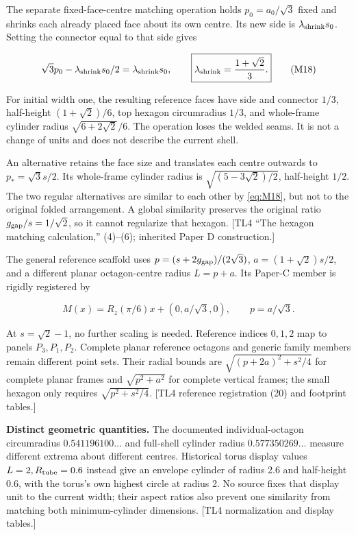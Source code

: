 \documentclass[11pt,a4paper]{article}
\begin{document}
The separate fixed-face-centre matching operation holds \(p_0=a_0/\sqrt3\) fixed and shrinks each already placed face about its own centre. Its new side is \(\lambda_{\rm shrink}s_0\). Setting the connector equal to that side gives

\[
\sqrt3p_0-\lambda_{\rm shrink}s_0/2=\lambda_{\rm shrink}s_0,
\qquad
\boxed{\lambda_{\rm shrink}=\frac{1+\sqrt2}{3}.}
\tag{M18}\label{eq:M18}
\]

For initial width one, the resulting reference faces have side and connector \(1/3\), half-height \((1+\sqrt2)/6\), top hexagon circumradius \(1/3\), and whole-frame cylinder radius \(\sqrt{6+2\sqrt2}/6\). The operation loses the welded seams. It is not a change of units and does not describe the current shell.

An alternative retains the face size and translates each centre outwards to \(p_*=\sqrt3s/2\). Its whole-frame cylinder radius is \(\sqrt{(5-3\sqrt2)/2}\), half-height \(1/2\). The two regular alternatives are similar to each other by \eqref{eq:M18}, but not to the original folded arrangement. A global similarity preserves the original ratio \(g_{\rm gap}/s=1/\sqrt2\), so it cannot regularize that hexagon. [TL4 \textquotedblleft{}The hexagon matching calculation,\textquotedblright{} (4)--(6); inherited Paper D construction.]

The general reference scaffold uses \(p=(s+2g_{\rm gap})/(2\sqrt3)\), \(a=(1+\sqrt2)s/2\), and a different planar octagon-centre radius \(L=p+a\). Its Paper-C member is rigidly registered by

\[
M(x)=R_z(\pi/6)x+(0,a/\sqrt3,0),\qquad p=a/\sqrt3.
\tag{M19}\label{eq:M19}
\]

At \(s=\sqrt2-1\), no further scaling is needed. Reference indices \(0,1,2\) map to panels \(P_3,P_1,P_2\). Complete planar reference octagons and generic family members remain different point sets. Their radial bounds are \(\sqrt{(p+2a)^2+s^2/4}\) for complete planar frames and \(\sqrt{p^2+a^2}\) for complete vertical frames; the small hexagon only requires \(\sqrt{p^2+s^2/4}\). [TL4 reference registration (20) and footprint tables.]

\textbf{Distinct geometric quantities.} The documented individual-octagon circumradius \(0.541196100\ldots\) and full-shell cylinder radius \(0.577350269\ldots\) measure different extrema about different centres. Historical torus display values \(L=2,R_{\rm tube}=0.6\) instead give an envelope cylinder of radius 2.6 and half-height 0.6, with the torus's own highest circle at radius 2. No source fixes that display unit to the current width; their aspect ratios also prevent one similarity from matching both minimum-cylinder dimensions. [TL4 normalization and display tables.]
\end{document}
